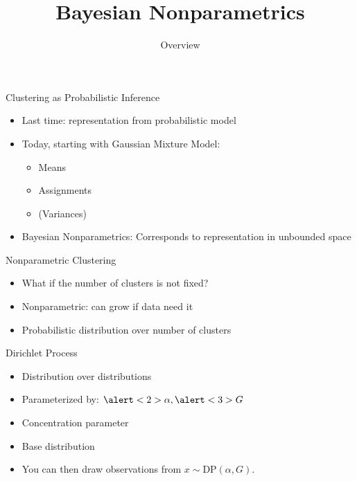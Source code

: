 \documentclass[compress]{beamer}
\title{Bayesian Nonparametrics}
\date{Overview}
\begin{document}
\frame{\titlepage
}


\begin{frame}{Clustering as Probabilistic Inference}
	\begin{itemize}
		\item Last time: representation from probabilistic
                  model
                \item Today, starting with Gaussian Mixture Model:
		\begin{itemize}
			\item Means
			\item Assignments
			\item (Variances)
		\end{itemize}
		\pause
		\item Bayesian Nonparametrics: Corresponds to representation in unbounded space
	\end{itemize}
\end{frame}

\begin{frame}{Nonparametric Clustering}

	\begin{itemize}
		\item What if the number of clusters is not fixed?
		\item Nonparametric: can grow if data need it
		\item Probabilistic distribution over number of clusters
	\end{itemize}

\end{frame}



\begin{frame}{Dirichlet Process}

\begin{itemize}
	\item Distribution over distributions
	\item Parameterized by: $\alert<2>{\alpha}, \alert<3>{G}$
	\item<2-> Concentration parameter
	\item<3-> Base distribution
	\item<4-> You can then draw observations from $x \sim $DP$(\alpha, G)$.
\end{itemize}

\end{frame}
\end{document}
